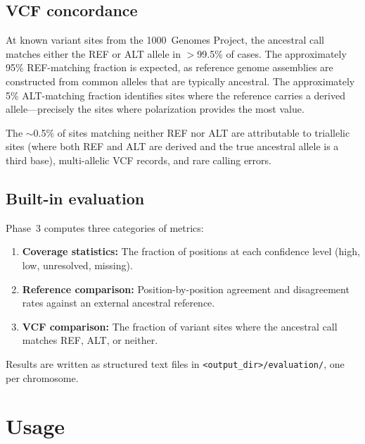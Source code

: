 \documentclass[11pt,a4paper]{article}
\begin{document}
\subsection{VCF concordance}
\label{sec:vcf}

At known variant sites from the 1000~Genomes Project, the ancestral call
matches either the REF or ALT allele in $>$99.5\% of cases. The
approximately 95\% REF-matching fraction is expected, as reference genome
assemblies are constructed from common alleles that are typically ancestral.
The approximately 5\% ALT-matching fraction identifies sites where the
reference carries a derived allele---precisely the sites where polarization
provides the most value.

The $\sim$0.5\% of sites matching neither REF nor ALT are attributable to
triallelic sites (where both REF and ALT are derived and the true ancestral
allele is a third base), multi-allelic VCF records, and rare calling errors.

\subsection{Built-in evaluation}
\label{sec:evalmodule}

Phase~3 computes three categories of metrics:

\begin{enumerate}
    \item \textbf{Coverage statistics:} The fraction of positions at each
        confidence level (high, low, unresolved, missing).
    \item \textbf{Reference comparison:} Position-by-position agreement and
        disagreement rates against an external ancestral reference.
    \item \textbf{VCF comparison:} The fraction of variant sites where the
        ancestral call matches REF, ALT, or neither.
\end{enumerate}

Results are written as structured text files in
\texttt{<output\_dir>/evaluation/}, one per chromosome.

\section{Usage}
\label{sec:usage}

\end{document}

